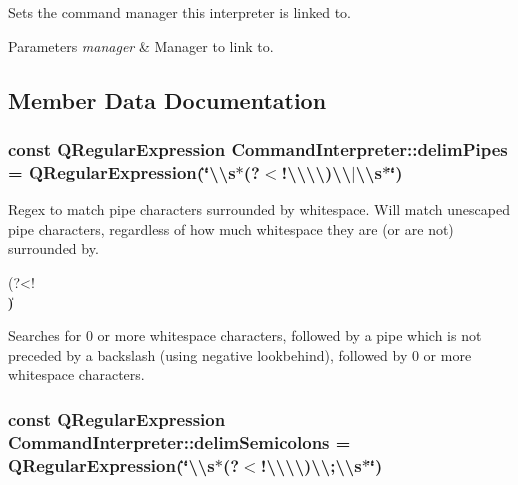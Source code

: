 Sets the command manager this interpreter is linked to. 


\begin{DoxyParams}{Parameters}
{\em manager} & Manager to link to. \\
\hline
\end{DoxyParams}


\subsection{Member Data Documentation}
\hypertarget{class_command_interpreter_ab4511b44fc5231f0527644e41b057398}{
\subsubsection[{delim\-Pipes}]{\setlength{\rightskip}{0pt plus 5cm}const Q\-Regular\-Expression Command\-Interpreter\-::delim\-Pipes = Q\-Regular\-Expression(\char`\"{}\textbackslash{}\textbackslash{}s$\ast$(?$<$!\textbackslash{}\textbackslash{}\textbackslash{}\textbackslash{})\textbackslash{}\textbackslash{}$|$\textbackslash{}\textbackslash{}s$\ast$\char`\"{})\hspace{0.3cm}{\ttfamily [static]}}}\label{class_command_interpreter_ab4511b44fc5231f0527644e41b057398}


Regex to match pipe characters surrounded by whitespace. Will match unescaped pipe characters, regardless of how much whitespace they are (or are not) surrounded by.\par
 {\bfseries  }

\begin{DoxyVerb}\s*(?<!\\)\|\s* \end{DoxyVerb}
\par
 Searches for 0 or more whitespace characters, followed by a pipe which is not preceded by a backslash (using negative lookbehind), followed by 0 or more whitespace characters. \hypertarget{class_command_interpreter_abb5a98083df85f3bb4f3680c5d7a26a9}{
\subsubsection[{delim\-Semicolons}]{\setlength{\rightskip}{0pt plus 5cm}const Q\-Regular\-Expression Command\-Interpreter\-::delim\-Semicolons = Q\-Regular\-Expression(\char`\"{}\textbackslash{}\textbackslash{}s$\ast$(?$<$!\textbackslash{}\textbackslash{}\textbackslash{}\textbackslash{})\textbackslash{}\textbackslash{};\textbackslash{}\textbackslash{}s$\ast$\char`\"{})\hspace{0.3cm}{\ttfamily [static]}}}\label{class_command_interpreter_abb5a98083df85f3bb4f3680c5d7a26a9}



